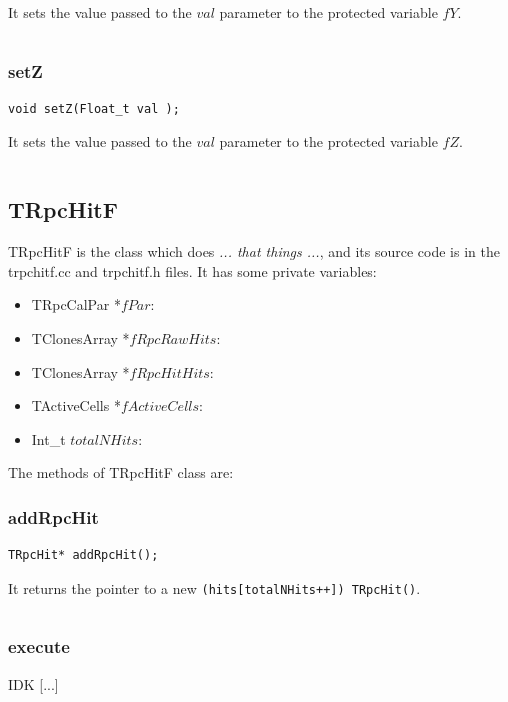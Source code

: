 \documentclass[a4paper]{book}
\begin{document}
It sets the value passed to the $val$ parameter to the protected variable $fY$.

\[\]

\subsubsection{setZ}

\begin{lstlisting}
void setZ(Float_t val );
\end{lstlisting}

It sets the value passed to the $val$ parameter to the protected variable $fZ$.

\[\]

\subsection{TRpcHitF}

TRpcHitF is the class which does \textit{... that things ...}, and its source code is in the trpchitf.cc and trpchitf.h files. It has some private variables:

\begin{itemize}
    \item TRpcCalPar *$fPar$: 
    \item TClonesArray *$fRpcRawHits$: 
    \item TClonesArray *$fRpcHitHits$: 
    \item TActiveCells *$fActiveCells$: 
    \item Int\_t $totalNHits$: 
\end{itemize}

The methods of TRpcHitF class are:

\subsubsection{addRpcHit}

\begin{lstlisting}
TRpcHit* addRpcHit();
\end{lstlisting}

It returns the pointer to a new \texttt{(hits[totalNHits++]) TRpcHit()}.

\[\]

\subsubsection{execute}

IDK [...]
\end{document}
